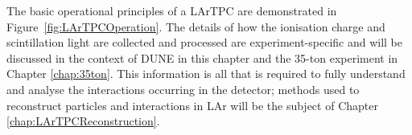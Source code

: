 The basic operational principles of a LArTPC are demonstrated in Figure~\ref{fig:LArTPCOperation}.  The details of how the ionisation charge and scintillation light are collected and processed are experiment-specific and will be discussed in the context of DUNE in this chapter and the 35-ton experiment in Chapter \ref{chap:35ton}.  This information is all that is required to fully understand and analyse the interactions occurring in the detector; methods used to reconstruct particles and interactions in LAr will be the subject of Chapter \ref{chap:LArTPCReconstruction}.

